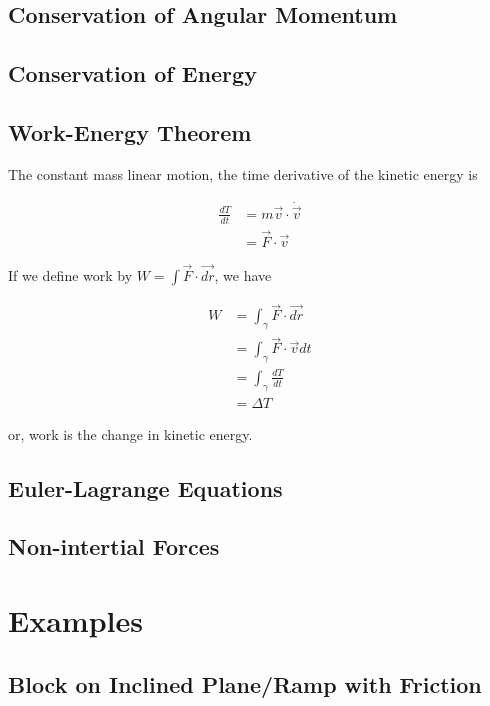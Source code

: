 \documentclass[main.tex]{subfiles}
\begin{document}
\begin{appendices}
\section{Conservation of Angular Momentum}

\section{Conservation of Energy}

\section{Work-Energy Theorem} \label{dvn: work-energy}

The constant mass linear motion, the time derivative of the kinetic energy is

\begin{align*}
\frac{dT}{dt} &= m \vec{v} \cdot \dot{\vec{v}} \\
&= \vec{F} \cdot \vec{v}
\end{align*}

If we define work by $W = \int \vec{F} \cdot \vec{dr}$, we have

\begin{align*}
W &= \int_{\gamma} \vec{F} \cdot \vec{dr} \\
&= \int_{\gamma} \vec{F} \cdot \vec{v} dt \\
&= \int_{\gamma} \frac{dT}{dt} \\
&= \Delta T
\end{align*}

or, work is the change in kinetic energy.

\section{Euler-Lagrange Equations}

\section{Non-intertial Forces}

\chapter{Examples}

\section{Block on Inclined Plane/Ramp with Friction}


\end{appendices}
\end{document}
